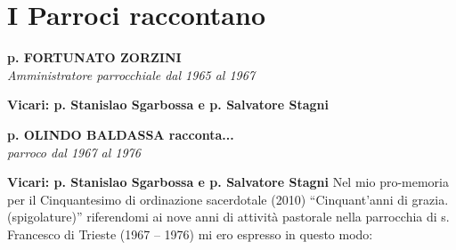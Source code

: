 \chapter{I Parroci raccontano}
\label{chap:Testimonianze}

\begin{center}
\textbf{\Large p. FORTUNATO ZORZINI}\\
	\textit{Amministratore parrocchiale dal 1965 al 1967}
\end{center}
\textbf{Vicari: p. Stanislao Sgarbossa e p. Salvatore Stagni}
\bigbreak 

\begin{center}
\textbf{\Large p. OLINDO BALDASSA racconta...}\\
	\textit{parroco dal 1967 al 1976}
\end{center}
\textbf{Vicari: p. Stanislao Sgarbossa e p. Salvatore Stagni}
\bigbreak 
\noindent Nel mio pro-memoria per il Cinquantesimo di ordinazione sacerdotale (2010) “Cinquant’anni di grazia. (spigolature)” riferendomi ai nove anni di attività pastorale nella parrocchia di s. Francesco di Trieste (1967 – 1976) mi ero espresso in questo modo:
\bigbreak 
